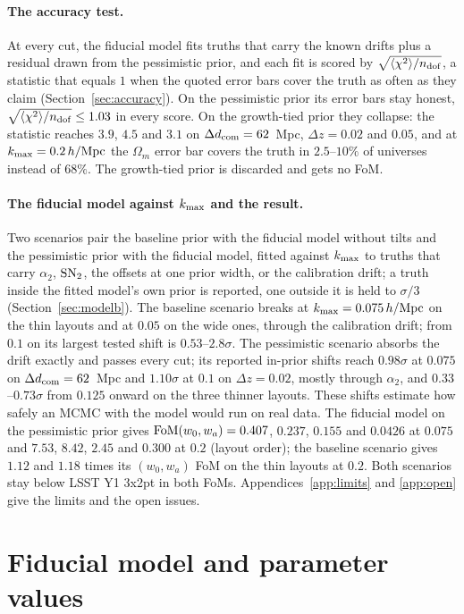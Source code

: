 \documentclass[11pt]{article}
\newcommand{\chidof}{\sqrt{\langle \chi^2 \rangle / n_{\rm dof}}}
\newcommand{\kmax}{k_{\rm max}}
\newcommand{\hMpc}{\,h/{\rm Mpc}}
\newcommand{\SNt}{{\rm SN}_2}
\begin{document}
\paragraph{The accuracy test.}
At every cut, the fiducial model fits truths that carry the known drifts
plus a residual drawn from the pessimistic prior, and each fit is
scored by $\chidof$, a statistic that equals $1$ when the quoted error
bars cover the truth as often as they claim
(Section~\ref{sec:accuracy}).  On the pessimistic prior its error bars
stay honest, $\chidof \le 1.03$ in every score.  On the growth-tied
prior they collapse: the statistic reaches $3.9$, $4.5$ and $3.1$ on
$\Delta d_{\rm com} = 62$~Mpc, $\Delta z = 0.02$ and $0.05$, and at
$\kmax = 0.2\hMpc$ the $\Omega_m$ error bar covers the truth in
$2.5$--$10\%$ of universes instead of $68\%$.  The growth-tied prior
is discarded and gets no FoM.

\paragraph{The fiducial model against $\kmax$ and the result.}
Two scenarios pair the baseline prior with the fiducial model without
tilts and the pessimistic
prior with the fiducial model, fitted against $\kmax$ to truths that
carry $\alpha_2$, $\SNt$, the offsets at one prior width, or the
calibration drift; a truth inside the fitted model's own prior is
reported, one outside it is held to $\sigma/3$
(Section~\ref{sec:modelb}).  The baseline scenario breaks at
$\kmax = 0.075\hMpc$ on the thin layouts and at $0.05$ on the wide
ones, through the calibration drift; from $0.1$ on its largest tested
shift is $0.53$--$2.8\sigma$.  The pessimistic scenario absorbs the
drift exactly and passes every cut; its reported in-prior shifts reach
$0.98\sigma$ at $0.075$ on $\Delta d_{\rm com} = 62$~Mpc and
$1.10\sigma$ at $0.1$ on $\Delta z = 0.02$, mostly through $\alpha_2$,
and $0.33$--$0.73\sigma$ from $0.125$ onward on the three thinner
layouts.  These shifts estimate how safely an MCMC with the model
would run on real data.  The fiducial model on the pessimistic prior
gives ${\rm FoM}(w_0, w_a) = 0.407$, $0.237$, $0.155$ and $0.0426$ at
$0.075$ and $7.53$, $8.42$, $2.45$ and $0.300$ at $0.2$ (layout
order); the baseline scenario gives $1.12$ and $1.18$ times its
$(w_0, w_a)$ FoM on the thin layouts at $0.2$.  Both scenarios stay
below LSST Y1 3x2pt in both FoMs.
Appendices~\ref{app:limits} and \ref{app:open} give the limits and the
open issues.

\section{Fiducial model and parameter values}
\label{sec:fiducial}
\end{document}
